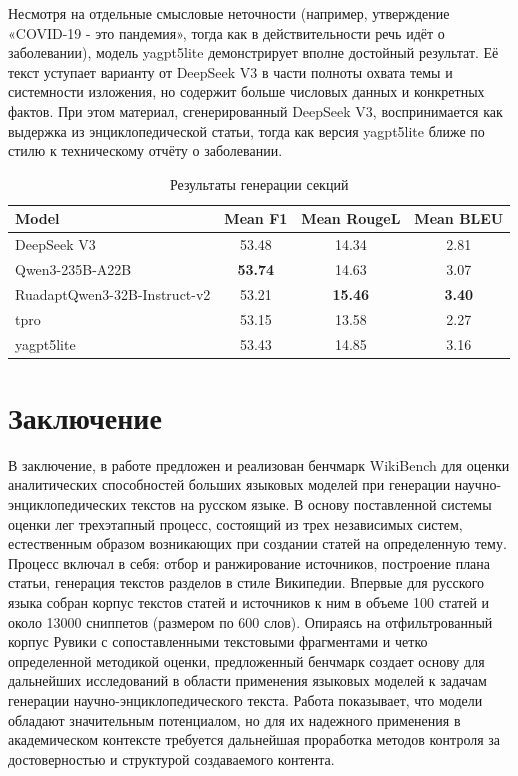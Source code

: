 \documentclass{article}
\theoremstyle{definition}
\theoremstyle{plain}
\begin{document}
Несмотря на отдельные смысловые неточности (например, утверждение «COVID-19 - это пандемия», тогда как в действительности речь идёт о заболевании), 
модель yagpt5lite демонстрирует вполне достойный результат. Её текст уступает варианту от DeepSeek V3 в части полноты охвата темы и системности изложения, 
но содержит больше числовых данных и конкретных фактов. При этом материал, сгенерированный DeepSeek V3, воспринимается как выдержка из энциклопедической статьи, 
тогда как версия yagpt5lite ближе по стилю к техническому отчёту о заболевании.


\begin{table}[ht!]
\centering
\caption{Результаты генерации секций}
\begin{tabular}{l|c|c|c}
\hline
\textbf{Model} & \textbf{Mean F1} & \textbf{Mean RougeL} & \textbf{Mean BLEU}\\
\hline
DeepSeek V3                  & 53.48 & 14.34 & 2.81\\
Qwen3-235B-A22B              & \textbf{53.74} & 14.63 & 3.07\\
RuadaptQwen3-32B-Instruct-v2 & 53.21 & \textbf{15.46} & \textbf{3.40}\\
tpro                         & 53.15 & 13.58 & 2.27\\
yagpt5lite                   & 53.43 & 14.85 & 3.16\\
\hline
\end{tabular}
\label{tab:secs}
\end{table}

\section*{Заключение}
В заключение, в работе предложен и реализован бенчмарк WikiBench для оценки аналитических способностей больших языковых моделей при генерации научно-энциклопедических текстов на русском языке.
В основу поставленной системы оценки лег трехэтапный процесс, состоящий из трех независимых систем, естественным образом возникающих при создании статей на определенную тему.
Процесс включал в себя: отбор и ранжирование источников, построение плана статьи, генерация текстов разделов в стиле Википедии.
Впервые для русского языка собран корпус текстов статей и источников к ним в объеме 100 статей и около 13000 сниппетов (размером по 600 слов). Опираясь на отфильтрованный корпус Рувики с сопоставленными текстовыми фрагментами и четко определенной методикой оценки, 
предложенный бенчмарк создает основу для дальнейших исследований в области применения языковых моделей к задачам генерации научно-энциклопедического текста. Работа показывает, что модели обладают значительным потенциалом, 
но для их надежного применения в академическом контексте требуется дальнейшая проработка методов контроля за достоверностью и структурой создаваемого контента.
\end{document}
